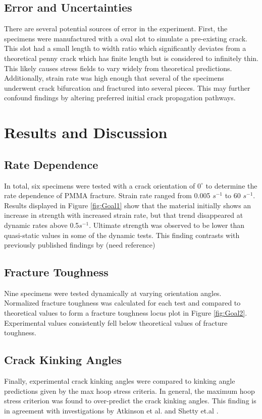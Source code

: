 \documentclass[12pt]{article}
\begin{document}
\subsection{Error and Uncertainties} %
There are several potential sources of error in the experiment. First, the specimens were manufactured with a oval slot to simulate a pre-existing crack. This slot had a small length to width ratio which significantly deviates from a theoretical penny crack which has finite length but is considered to infinitely thin. This likely causes stress fields to vary widely from theoretical predictions. Additionally, strain rate was high enough that several of the specimens underwent crack bifurcation and fractured into several pieces. This may further confound findings by altering preferred initial crack propagation pathways. 

\section{Results and Discussion} %
\subsection{Rate Dependence}
In total, six specimens were tested with a crack orientation of $0^{\circ}$ to determine the rate dependence of PMMA fracture. Strain rate ranged from 0.005 $s^{-1}$ to 60 $s^{-1}$. Results displayed in Figure \ref{fig:Goal1} show that the material initially shows an increase in strength with increased strain rate, but that trend disappeared at dynamic rates above 0.5$s^{-1}$. Ultimate strength was observed to be lower than quasi-static values in some of the dynamic tests. This finding contrasts with previously published findings by (need reference) 
\subsection{Fracture Toughness}
Nine specimens were tested dynamically at varying orientation angles. Normalized fracture toughness was calculated for each test and compared to theoretical values to form a fracture toughness locus plot in Figure \ref{fig:Goal2}. Experimental values consistently fell below theoretical values of fracture toughness. 
\subsection{Crack Kinking Angles}
Finally, experimental crack kinking angles were compared to kinking angle predictions given by the max hoop stress criteria.  In general, the maximum hoop stress criterion was found to over-predict the crack kinking angles. This finding is in agreement with investigations by Atkinson et al. and Shetty et.al \cite{Atkinson} \cite{Shetty}.
\end{document}
